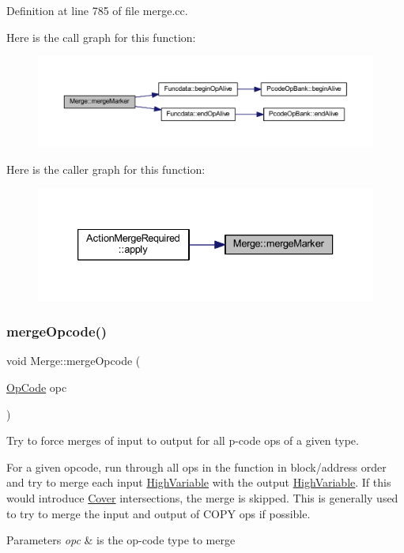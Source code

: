 Definition at line 785 of file merge.\+cc.

Here is the call graph for this function\+:
\nopagebreak
\begin{figure}[H]
\begin{center}
\leavevmode
\includegraphics[width=350pt]{class_merge_aedcf63d8d5400410d06ef4aa250275a1_cgraph}
\end{center}
\end{figure}
Here is the caller graph for this function\+:
\nopagebreak
\begin{figure}[H]
\begin{center}
\leavevmode
\includegraphics[width=333pt]{class_merge_aedcf63d8d5400410d06ef4aa250275a1_icgraph}
\end{center}
\end{figure}
\mbox{\label{class_merge_a55762a93af96a7e8abab70b169302b59}} 
\subsubsection{\texorpdfstring{mergeOpcode()}{mergeOpcode()}}
{\footnotesize\ttfamily void Merge\+::merge\+Opcode (\begin{DoxyParamCaption}\item[{\mbox{\hyperlink{opcodes_8hh_abeb7dfb0e9e2b3114e240a405d046ea7}{Op\+Code}}}]{opc }\end{DoxyParamCaption})}



Try to force merges of input to output for all p-\/code ops of a given type. 

For a given opcode, run through all ops in the function in block/address order and try to merge each input \mbox{\hyperlink{class_high_variable}{High\+Variable}} with the output \mbox{\hyperlink{class_high_variable}{High\+Variable}}. If this would introduce \mbox{\hyperlink{class_cover}{Cover}} intersections, the merge is skipped. This is generally used to try to merge the input and output of C\+O\+PY ops if possible. 
\begin{DoxyParams}{Parameters}
{\em opc} & is the op-\/code type to merge \\
\hline
\end{DoxyParams}


